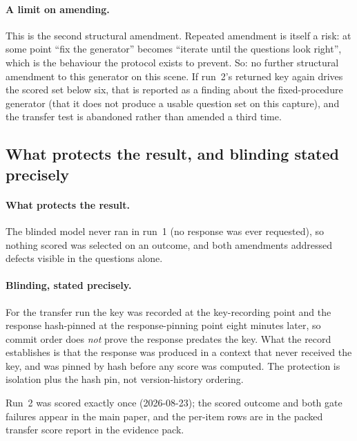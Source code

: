 \paragraph{A limit on amending.} This is the second structural amendment.
Repeated amendment is itself a risk: at some point ``fix the generator''
becomes ``iterate until the questions look right'', which is the behaviour
the protocol exists to prevent. So: no further structural amendment to this
generator on this scene. If run~2's returned key again drives the scored set
below six, that is reported as a finding about the fixed-procedure generator
(that it does not produce a usable question set on this capture), and
the transfer test is abandoned rather than amended a third time.

\subsection{What protects the result, and blinding stated precisely}

\paragraph{What protects the result.} The blinded model never ran in run~1
(no response was ever requested), so nothing scored was selected on an
outcome, and both amendments addressed defects visible in the questions
alone.

\paragraph{Blinding, stated precisely.} For the transfer run the key was
recorded at the key-recording point and the response hash-pinned at the
response-pinning point eight minutes later, so commit order does \emph{not}
prove the response predates the key. What the record establishes is that
the response was produced in a context that never received the key, and was
pinned by hash before any score was computed. The protection is isolation
plus the hash pin, not version-history ordering.

Run~2 was scored exactly once (2026-08-23); the scored outcome and both gate
failures appear in the main paper, and the per-item rows are in the packed
transfer score report in the evidence pack.
